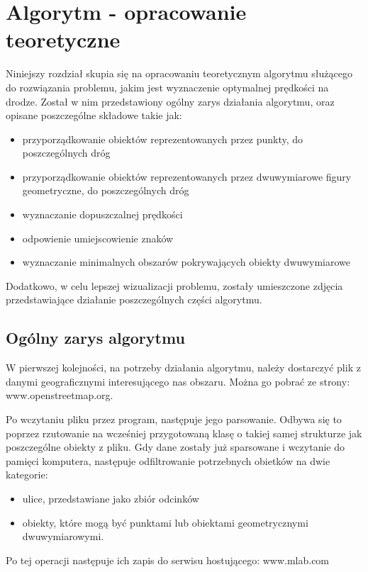 \chapter{Algorytm - opracowanie teoretyczne}
\label{cha:AlgorytmTeoria}

Niniejszy rozdział skupia się na opracowaniu teoretycznym algorytmu służącego do rozwiązania problemu, jakim jest wyznaczenie optymalnej prędkości na drodze. Został w nim przedstawiony ogólny zarys działania algorytmu, oraz opisane poszczególne składowe takie jak:
\begin{itemize}
\item przyporządkowanie obiektów reprezentowanych przez punkty, do poszczególnych dróg
\item przyporządkowanie obiektów reprezentowanych przez dwuwymiarowe figury geometryczne, do poszczególnych dróg
\item wyznaczanie dopuszczalnej prędkości
\item odpowienie umiejscowienie znaków
\item wyznaczanie minimalnych obszarów pokrywających obiekty dwuwymiarowe
\end{itemize}

Dodatkowo, w celu lepszej wizualizacji problemu, zostały umieszczone zdjęcia przedstawiające działanie poszczególnych części algorytmu.

\section{Ogólny zarys algorytmu}
\label{cha:ogolnyzarys}

W pierwszej kolejności, na potrzeby działania algorytmu, należy dostarczyć plik z danymi geograficznymi interesującego nas obszaru. Można go pobrać ze strony: www.openstreetmap.org.  

Po wczytaniu pliku przez program, następuje jego parsowanie. Odbywa się to poprzez rzutowanie na wcześniej przygotowaną klasę o takiej samej strukturze jak poszczególne obiekty z pliku. Gdy dane zostały już sparsowane i wczytanie do pamięci komputera, następuje odfiltrowanie potrzebnych obietków na dwie kategorie:
\begin{itemize}
\item ulice, przedstawiane jako zbiór odcinków
\item obiekty, które mogą być punktami lub obiektami geometrycznymi dwuwymiarowymi.
\end{itemize}
Po tej operacji następuje ich zapis do serwisu hostującego: www.mlab.com


